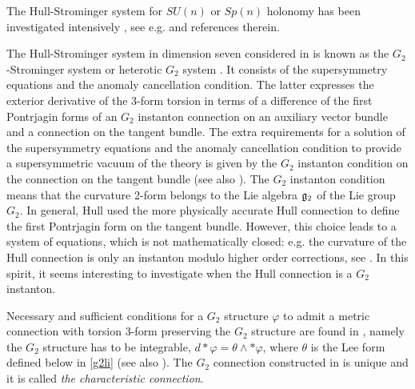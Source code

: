 \documentclass[10pt,british]{article}
\def\p{{\varphi}}
\begin{document}
The Hull-Strominger system for $SU(n)$ or $Sp(n)$ holonomy has been investigated intensively , see e.g.  \cite{LY,yau,yau1,FIUV,XS,OLS,PPZ,PPZ1,PPZ2,PPZ3,PPZ4,FHP,FHP1,CPYau,CPY1,Ph} and references therein.


The Hull-Strominger system in dimension seven considered in \cite{CGFT,Oss2} is known as  the $G_2$-Strominger system or heterotic $G_2$ system \cite{Oss2}. It  consists of the supersymmetry  equations and the anomaly cancellation condition. The latter expresses the exterior derivative of the 3-form torsion in terms of a difference of the first Pontrjagin forms of an $G_2$ instanton connection on an auxiliary vector bundle and a connection on the tangent bundle. The extra requirements for a solution of the supersymmetry equations  and the anomaly cancellation condition to provide  a supersymmetric vacuum of the theory is given by the $G_2$ instanton condition on the connection on the tangent bundle \cite{Iv} (see also \cite{MS,XS}). The $G_2$ instanton condition means that the curvature 2-form belongs to the Lie algebra $\frak{g}_2$ of the Lie group $G_2$. In general, 
 Hull \cite{Hull}  used the more physically accurate Hull connection   to define
the first Pontrjagin form on the tangent bundle. However, this choice leads to a system of equations, which is not
mathematically closed: e.g. the curvature of the Hull connection is only an  instanton modulo higher order  corrections, see \cite{MS}.  In this spirit, it  seems interesting to investigate when the Hull connection is a $G_2$ instanton. 


Necessary and sufficient  conditions for a $G_2$ structure  $\p$ to admit a metric connection with torsion 3-form preserving the $G_2$ structure are found in  \cite{FI}, namely the $G_2$ structure has to be integrable,  $d*\p=\theta\wedge*\p$, where $\theta$ is the Lee form defined below in \eqref{g2li} (see also \cite{GKMW,FI1,GMW,GMPW,II}). The $G_2$ connection constructed in \cite[Theorem~4.8]{FI} is unique and it is called  \emph{the characteristic connection}. 
\end{document}
